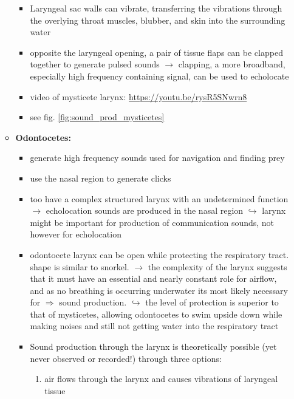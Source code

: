 \documentclass[12pt,a4paper]{article}
\begin{document}
\begin{itemize}
\begin{itemize}
\begin{itemize}
       \item Laryngeal sac walls can vibrate, transferring the vibrations through the overlying throat muscles, blubber, and skin into the surrounding water
       \item opposite the laryngeal opening, a pair of tissue flaps can be clapped together to generate pulsed sounds
       \newline \indent $\longrightarrow$ clapping, a more broadband, especially high frequency containing signal, can be used to echolocate
       \item video of mysticete larynx: \url{https://youtu.be/rysR5SNwrn8}
       \item see fig. \ref{fig:sound_prod_mysticetes}
     \end{itemize}
     \item \textbf{Odontocetes:}
     \begin{itemize}
       \item generate high frequency sounds used for navigation and finding prey
       \item use the nasal region to generate clicks
       \item too have a complex structured larynx with an undetermined function
       \newline \indent $\longrightarrow$ echolocation sounds are produced in the nasal region
       \newline \indent $\hookrightarrow$ larynx might be important for production of communication sounds, not however for echolocation
       \item odontocete larynx can be open while protecting the respiratory tract. shape is similar to snorkel.
       \newline \indent $\longrightarrow$ the complexity of the larynx suggests that it must have an essential and nearly constant role for airflow, and as no breathing is occurring underwater its most likely necessary for $\Longrightarrow$ sound production.
       \newline \indent $\hookrightarrow$ the level of protection is superior to that of mysticetes, allowing odontocetes to swim upside down while making noises and still not getting water into the respiratory tract
       \item Sound production through the larynx is theoretically possible (yet never observed or recorded!) through three options:
       \begin{enumerate}
         \item air flows through the larynx and causes vibrations of laryngeal tissue

\end{enumerate}
\end{itemize}
\end{itemize}
\end{itemize}
\end{document}
